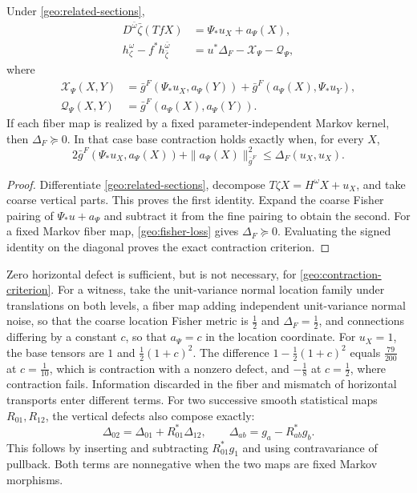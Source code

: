 Under \cref{geo:related-sections},
\begin{align}
D^{\bar\omega}\bar\zeta(TfX)&=\Psi_*u_X+a_\Psi(X),\\
h^\omega_\zeta-f^*h^{\bar\omega}_{\bar\zeta}
&=u^*\Delta_F-\mathcal X_\Psi-\mathcal Q_\Psi,
\label{geo:signed-identity}
\end{align}
where
\begin{align}
\mathcal X_\Psi(X,Y)
&=\bar g^F(\Psi_*u_X,a_\Psi(Y))
+\bar g^F(a_\Psi(X),\Psi_*u_Y),\\
\mathcal Q_\Psi(X,Y)&=\bar g^F(a_\Psi(X),a_\Psi(Y)).
\end{align}
If each fiber map is realized by a fixed parameter-independent Markov kernel, then $\Delta_F\succeq0$. In that case base contraction holds exactly when, for every $X$,
\begin{equation}
2\bar g^F(\Psi_*u_X,a_\Psi(X))
+\|a_\Psi(X)\|_{\bar g^F}^2
\le\Delta_F(u_X,u_X).
\label{geo:contraction-criterion}
\end{equation}
\begin{proof}
Differentiate \cref{geo:related-sections}, decompose $T\zeta X=H^\omega X+u_X$, and take coarse vertical parts. This proves the first identity. Expand the coarse Fisher pairing of $\Psi_*u+a_\Psi$ and subtract it from the fine pairing to obtain the second. For a fixed Markov fiber map, \cref{geo:fisher-loss} gives $\Delta_F\succeq0$. Evaluating the signed identity on the diagonal proves the exact contraction criterion.
\end{proof}

Zero horizontal defect is sufficient, but is not necessary, for \cref{geo:contraction-criterion}. For a witness, take the unit-variance normal location family under translations on both levels, a fiber map adding independent unit-variance normal noise, so that the coarse location Fisher metric is $\tfrac12$ and $\Delta_F=\tfrac12$, and connections differing by a constant $c$, so that $a_\Psi=c$ in the location coordinate. For $u_X=1$, the base tensors are $1$ and $\tfrac12(1+c)^2$. The difference $1-\tfrac12(1+c)^2$ equals $\tfrac{79}{200}$ at $c=\tfrac1{10}$, which is contraction with a nonzero defect, and $-\tfrac18$ at $c=\tfrac12$, where contraction fails. Information discarded in the fiber and mismatch of horizontal transports enter different terms. For two successive smooth statistical maps $R_{01},R_{12}$, the vertical defects also compose exactly:
\begin{equation}
\Delta_{02}=\Delta_{01}+R_{01}^*\Delta_{12},
\qquad
\Delta_{ab}=g_a-R_{ab}^*g_b.
\label{geo:defect-composition}
\end{equation}
This follows by inserting and subtracting $R_{01}^*g_1$ and using contravariance of pullback. Both terms are nonnegative when the two maps are fixed Markov morphisms.

